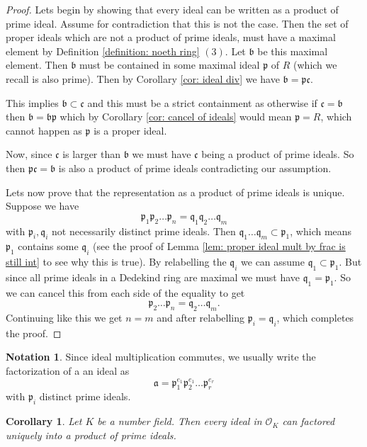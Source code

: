 \documentclass[11pt,a4paper]{report}
\theoremstyle{plain}
\newtheorem{corollary}[subsection]{Corollary}
\theoremstyle{definition}
\theoremstyle{definition}
\newtheorem{nota}[subsection]{Notation}
\def\gothb{\mathfrak{b}}
\def\gothc{\mathfrak{c}}
\def\gothp{\mathfrak{p}}
\def\gothq{\mathfrak{q}}
\def \OO {\mathcal{O}}
\def\gotha{\mathfrak{a}}
\begin{document}
	\begin{proof}
		Lets begin by showing that every ideal can be written as a product of prime ideal. Assume for contradiction that this is not the case. Then the set of proper ideals which are not a product of prime ideals, must have a maximal element by Definition \ref{definition: noeth ring} $(3)$. Let $\gothb$ be this maximal element. Then $\gothb$ must be contained in some maximal ideal $\gothp$ of $R$ (which we recall is also prime). Then by Corollary \ref{cor: ideal div} we have $\gothb=\gothp \gothc$. 
		
		This implies $\gothb \subset \gothc$ and this must be a strict containment as otherwise if $\gothc=\gothb$ then $\gothb=\gothb\gothp$ which by Corollary \ref{cor: cancel of ideals}  would mean $\gothp=R$, which cannot happen as $\gothp$ is a proper ideal. 
		
		Now, since $\gothc$ is larger than $\gothb$ we must have $\gothc$ being a product of prime ideals. So then $\gothp\gothc=\gothb$ is also a product of prime ideals contradicting our assumption. 
		
		Lets now prove that the representation as a product of prime ideals is unique. Suppose we have \[\gothp_1\gothp_2\dots\gothp_n=\gothq_1\gothq_2\dots\gothq_m\] with $\gothp_i,\gothq_i$ not necessarily distinct prime ideals. Then $\gothq_1\dots\gothq_m  \subset \gothp_1$, which means $\gothp_1$ contains some $\gothq_i$  (see the proof of Lemma \ref{lem: proper ideal mult by frac is still int} to see why this is true). By relabelling the $\gothq_i$ we can assume $\gothq_1 \subset \gothp_1$. But since all prime ideals in a Dedekind ring are maximal we must have $\gothq_1=\gothp_1$. So we can cancel this from each side of the equality to get \[\gothp_2\dots\gothp_n=\gothq_2\dots\gothq_m.\] Continuing like this we get $n=m$ and after relabelling $\gothp_i=\gothq_i$, which completes the proof.
		
		
		
		
	\end{proof}
	
	\begin{nota}
		Since ideal multiplication commutes, we usually write the factorization of a an ideal as \[\gotha=\gothp_1^{e_1}\gothp_2^{e_1}\dots\gothp_r^{e_r}\] with $\gothp_i$ distinct prime ideals. 
	\end{nota}
	
	\begin{corollary}
		Let $K$ be a number field. Then every ideal in $\OO_K$ can factored uniquely into a product of prime ideals.
	\end{corollary}
	
\end{document}
